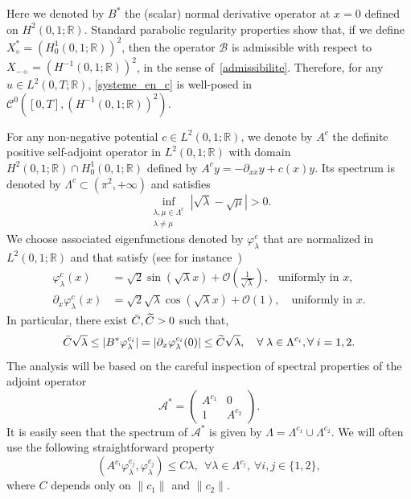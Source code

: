 \documentclass[11pt]{article}
\theoremstyle{definition}
\numberwithin{equation}{section}
\numberwithin{figure}{section}
\numberwithin{table}{section}
\newcommand{\fprop}[2]{\varphi^{#1}_{#2}}
\newcommand\As{\mathcal{A}^*}
\newcommand\B{\mathcal{B}}
\newcommand{\Xalphas}{X_\diamond^*}
\newcommand{\Xmalpha}{X_{-\diamond}}
\newcommand{\CC}{\mathcal{C}}
\newcommand{\R}{\mathbb{R}}
\let\oldtilde\tilde
\renewcommand*{\tilde}[1]{\mathchoice{\widetilde{#1}}{\widetilde{#1}}{\oldtilde{#1}}{\oldtilde{#1}}}\let\oldexists\exists
\renewcommand*{\exists}{\mathrel{\oldexists}}
\let\oldforall\forall
\renewcommand*{\forall}{\mathrel{\oldforall}}
\begin{document}
Here we denoted by $B^*$ the (scalar) normal derivative operator at $x=0$ defined on $H^2(0,1 ; \R)$. Standard parabolic regularity properties show that, if we define $\Xalphas=(H^1_0(0,1 ; \R))^2$, then the operator $\B$ is admissible with respect to\linebreak$\Xmalpha=(H^{-1}(0,1;\R))^2$, in the sense of~\eqref{admissibilite}. Therefore, for any $u\in L^2(0,T;\R)$, \eqref{systeme_en_c} is well-posed in $\CC^0([0,T],(H^{-1}(0,1 ; \R))^2)$.


For any non-negative potential $c\in L^2(0,1 ; \R)$, we denote by $A^c$ the definite positive self-adjoint operator in $L^2(0,1 ; \R)$ with domain $H^2(0,1 ; \R)\cap H^1_0(0,1 ; \R)$ defined by $A^c y=-\partial_{xx} y + c(x) y$. Its spectrum is denoted by $\Lambda^c\subset (\pi^2,+\infty)$ and satisfies
\begin{equation}\label{Asymptotique_Lambda_new}
\inf_{\substack{\lambda,\mu \in \Lambda^c\\ \lambda\neq\mu}} \left|\sqrt{\lambda}-\sqrt{\mu}\right| > 0.
\end{equation}
We choose associated eigenfunctions denoted by $\fprop{c}{\lambda}$ that are normalized in $L^2(0,1 ; \R)$ and that satisfy (see for instance~\cite[Theorem~4.11]{KirschBook})
\begin{align}
\fprop{c}{\lambda}(x) &= \sqrt{2}\sin(\sqrt{\lambda}x) + \mathcal{O}\left(\frac{1}{\sqrt{\lambda}} \right), \;\;\: \text{uniformly in }x,\label{Asymptotique_varphi_new}
\\
\partial_x \fprop{c}{\lambda}(x) &= \sqrt{2}\sqrt{\lambda} \cos(\sqrt{\lambda}x) + \mathcal{O}\left(1 \right), \quad \text{uniformly in }x.\label{Asymptotique_varphi'_new}
\end{align}
In particular, there exist $\bar{C},\tilde{C}>0$ such that,
\begin{equation}\label{observation_Ac}
\bar{C}\sqrt{\lambda} \leq \left|B^* \fprop{c_i}{\lambda}\right| = \left|\partial_x \fprop{c_i}{\lambda}(0)\right|\leq \tilde{C} \sqrt{\lambda}, \quad \forall \lambda\in \Lambda^{c_i}, \forall i=1,2.
\end{equation}
The analysis will be based on the careful inspection of spectral properties of the adjoint operator
\[
\As=
\begin{pmatrix}
A^{c_1}&0
\\
1 & A^{c_2}
\end{pmatrix}.
\]
It is easily seen that the spectrum of $\As$ is given by $\Lambda=\Lambda^{c_1}\cup \Lambda^{c_2}$. We will often use the following straightforward property
\begin{equation}\label{borne_H1_fprop}
(A^{c_i}\fprop{c_j}{\lambda},\fprop{c_j}{\lambda}) \leq C \lambda, \ \ \forall \lambda\in \Lambda^{c_j}, \ \forall i,j\in \{1,2\},
\end{equation}
where $C$ depends only on $\|c_1\|$ and $\|c_2\|$.
\end{document}

